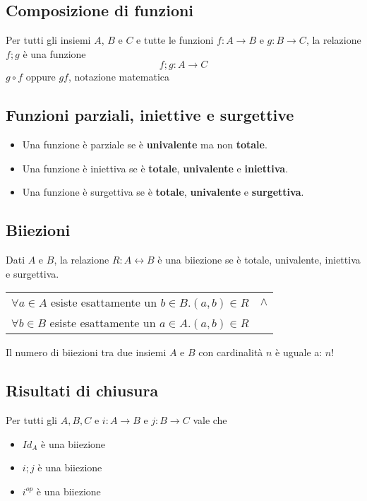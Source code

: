 \documentclass{article}
\begin{document}
\subsection*{Composizione di funzioni}
Per tutti gli insiemi \(A\), \(B\) e \(C\) e tutte le funzioni \(f: A \rightarrow B\) e \(g: B \rightarrow C\), la relazione \(f;g\) è una funzione
\[f;g: A \rightarrow C\]
\(g \circ f\) oppure \(gf\), notazione matematica
\subsection*{Funzioni parziali, iniettive e surgettive}
\begin{itemize}
    \item Una funzione è parziale se è \textbf{univalente} ma non \textbf{totale}.
    \item Una funzione è iniettiva se è \textbf{totale}, \textbf{univalente} e \textbf{iniettiva}.
    \item Una funzione è surgettiva se è \textbf{totale}, \textbf{univalente} e \textbf{surgettiva}.
\end{itemize}

\pagebreak

\subsection{Biiezioni}
Dati \(A\) e \(B\), la relazione \(R: A \leftrightarrow B\) è una biiezione se è totale, univalente, iniettiva e surgettiva.
\begin{center}
    \begin{tabular}{rl}
        \(\forall a \in A\) esiste esattamente un \(b \in B . (a,b) \in R\) & \(\land\) \\
        \(\forall b \in B\) esiste esattamente un \(a \in A . (a,b) \in R\) &
    \end{tabular}
\end{center}
Il numero di biiezioni tra due insiemi \(A\) e \(B\) con cardinalità \(n\) è uguale a: \(n!\)
\subsection*{Risultati di chiusura}
\noindent Per tutti gli \(A,B,C\) e \(i: A \rightarrow B\) e \(j: B \rightarrow C\) vale che
\begin{itemize}
    \item \(Id_A\) è una biiezione
    \item \(i;j\) è una biiezione
    \item \(i^{op}\) è una biiezione
\end{itemize}
\end{document}
